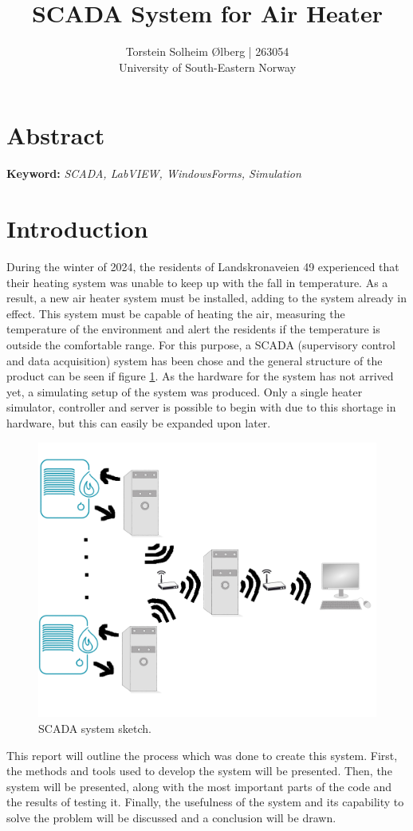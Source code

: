 \documentclass[11pt, A4paper, english]{article}
\author{Torstein Solheim Ølberg | 263054 \\
	University of South-Eastern Norway}
\title{SCADA System for Air Heater}
\begin{document}
	\maketitle
	
	\begin{multicols}{2}
		\section{Abstract}
\textbf{Keyword:} \textit{SCADA, LabVIEW, WindowsForms, Simulation}

		\section{Introduction}
During the winter of 2024, the residents of Landskronaveien 49 experienced that their heating system was unable to keep up with the fall in temperature. As a result, a new air heater system must be installed, adding to the system already in effect. This system must be capable of heating the air, measuring the temperature of the environment and alert the residents if the temperature is outside the comfortable range. For this purpose, a SCADA (supervisory control and data acquisition) system has been chose and the general structure of the product can be seen if figure \ref{system_sketch}. As the hardware for the system has not arrived yet, a simulating setup of the system was produced. Only a single heater simulator, controller and server is possible to begin with due to this shortage in hardware, but this can easily be expanded upon later. \\
			\begin{figure}[H]
\includegraphics[width=\columnwidth]{SCADA_sketch.png}
\caption{SCADA system sketch.}
\label{system_sketch}
			\end{figure}
This report will outline the process which was done to create this system. First, the methods and tools used to develop the system will be presented. Then, the system will be presented, along with the most important parts of the code and the results of testing it. Finally, the usefulness of the system and its capability to solve the problem will be discussed and a conclusion will be drawn.
		

\end{multicols}
\end{document}
